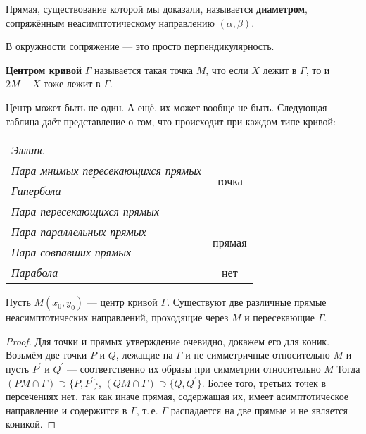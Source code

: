 \begin{definition}
    Прямая, существование которой мы доказали, называется \textbf{диаметром}, сопряжённым неасимптотическому направлению $(\alpha, \beta)$.
\end{definition}

\begin{orangebox}
    В окружности сопряжение --- это просто перпендикулярность.
\end{orangebox}

\begin{definition}
    \textbf{Центром кривой} $\Gamma$ называется такая точка $M$, что если $X$ лежит в $\Gamma$, то и $2M - X$ тоже лежит в $\Gamma$.
\end{definition}

\begin{orangebox}
    Центр может быть не один. А ещё, их может вообще не быть. Следующая таблица даёт представление о том, что происходит при каждом типе кривой:
    \begin{center}
        \begin{tabular}{| l | c |}
            \hline
            \textit{Эллипс} & \multirow{4}{*}{точка}\\
            \textit{Пара мнимых пересекающихся прямых} & \\
            \textit{Гипербола} & \\
            \textit{Пара пересекающихся прямых} & \\
            \hline
            \textit{Пара параллельных прямых} & \multirow{2}{*}{прямая}\\
            \textit{Пара совпавших прямых} & \\
            \hline
            \textit{Парабола} & нет\\
            \hline
        \end{tabular}
    \end{center}
\end{orangebox}

\begin{lemma}
    Пусть $M(x_0, y_0)$ --- центр кривой $\Gamma$. Существуют две различные прямые неасимптотических направлений, проходящие через $M$ и пересекающие $\Gamma$.
\end{lemma}

\begin{proof}
    Для точки и прямых утверждение очевидно, докажем его для коник. Возьмём две точки $P$ и $Q$, лежащие на $\Gamma$ и не симметричные относительно $M$ и пусть $P^\prime$ и $Q^\prime$ --- соответственно их образы при симметрии относительно $M$ Тогда $(PM \cap \Gamma) \supset\{P, P^\prime\}$, $(QM \cap \Gamma) \supset \{Q, Q^\prime\}$. Более того, третьих точек в персечениях нет, так как иначе прямая, содержащая их, имеет асимптотическое направление и содержится в $\Gamma$, т.\,е. $\Gamma$ распадается на две прямые и не является коникой.
\end{proof}

